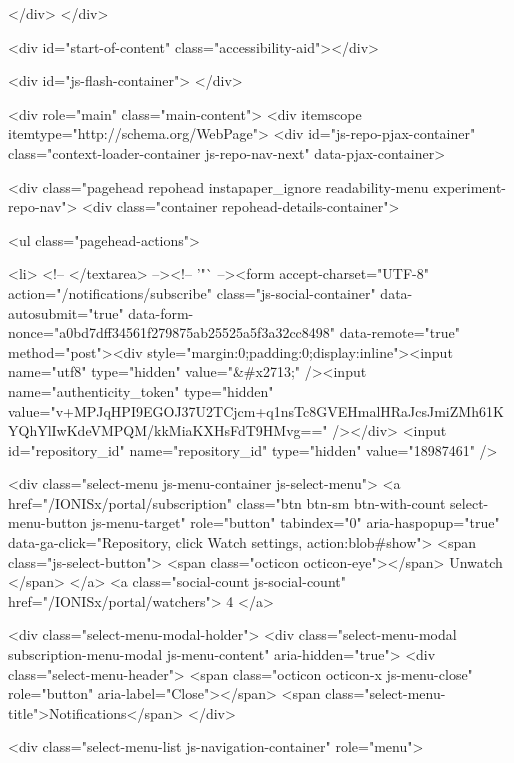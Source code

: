     
  </div>
</div>

      

      


    <div id="start-of-content" class="accessibility-aid"></div>

      <div id="js-flash-container">
</div>


    <div role="main" class="main-content">
        <div itemscope itemtype="http://schema.org/WebPage">
    <div id="js-repo-pjax-container" class="context-loader-container js-repo-nav-next" data-pjax-container>
      
<div class="pagehead repohead instapaper_ignore readability-menu experiment-repo-nav">
  <div class="container repohead-details-container">

    

<ul class="pagehead-actions">

  <li>
        <!-- </textarea> --><!-- '"` --><form accept-charset="UTF-8" action="/notifications/subscribe" class="js-social-container" data-autosubmit="true" data-form-nonce="a0bd7dff34561f279875ab25525a5f3a32cc8498" data-remote="true" method="post"><div style="margin:0;padding:0;display:inline"><input name="utf8" type="hidden" value="&#x2713;" /><input name="authenticity_token" type="hidden" value="v+MPJqHPI9EGOJ37U2TCjcm+q1nsTc8GVEHmalHRaJcsJmiZMh61KYQhYlIwKdeVMPQM/kkMiaKXHsFdT9HMvg==" /></div>      <input id="repository_id" name="repository_id" type="hidden" value="18987461" />

        <div class="select-menu js-menu-container js-select-menu">
          <a href="/IONISx/portal/subscription"
            class="btn btn-sm btn-with-count select-menu-button js-menu-target" role="button" tabindex="0" aria-haspopup="true"
            data-ga-click="Repository, click Watch settings, action:blob#show">
            <span class="js-select-button">
              <span class="octicon octicon-eye"></span>
              Unwatch
            </span>
          </a>
          <a class="social-count js-social-count" href="/IONISx/portal/watchers">
            4
          </a>

        <div class="select-menu-modal-holder">
          <div class="select-menu-modal subscription-menu-modal js-menu-content" aria-hidden="true">
            <div class="select-menu-header">
              <span class="octicon octicon-x js-menu-close" role="button" aria-label="Close"></span>
              <span class="select-menu-title">Notifications</span>
            </div>

              <div class="select-menu-list js-navigation-container" role="menu">

